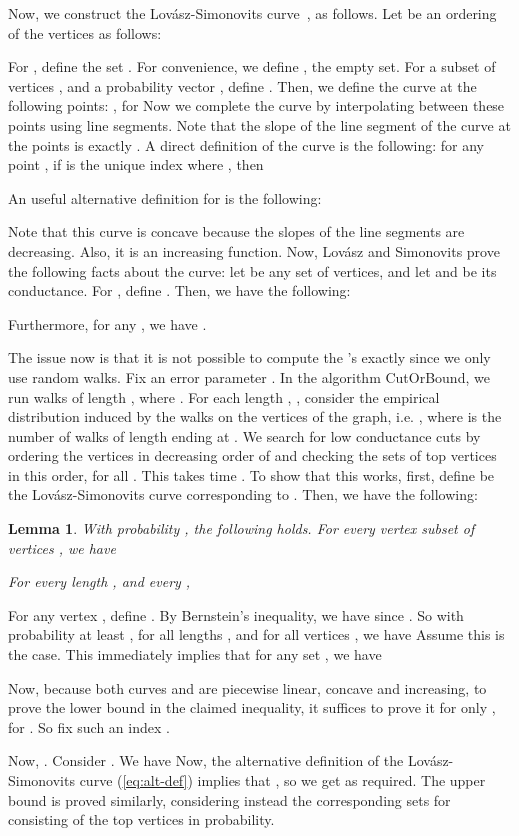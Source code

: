 \documentclass[11pt]{article}
\newtheorem{Lem}[theorem]{Lemma}
\newenvironment{myproof}{\noindent {\sc Proof:}}{}
\newcommand\CutOrBound{{\sc CutOrBound}\xspace}
\begin{document}
Now, we construct the Lov\'{a}sz-Simonovits curve~\cite{LS90},  as follows. Let  be an ordering of the vertices
as follows:

For , define the set . For convenience, we
define , the empty set. For a subset of vertices , and a
probability vector , define . Then, we define
the curve  at the following points: ,
for  Now we complete the curve  by
interpolating between these points using line segments. Note that the slope of
the line segment of the curve at the points  is
exactly .  A direct definition of the
curve is the following: for any point , if  is the unique
index where , then 

An useful alternative definition for  is the following:


Note that this curve is concave because the slopes of the line segments are
decreasing. Also, it is an increasing function. Now, Lov\'{a}sz and Simonovits prove the following facts about the
curve: let  be any set of vertices, and let  and  be its conductance.
For , define . Then, we have the following:

Furthermore, for any , we have
.

The issue now is that it is not possible to compute the 's exactly since we only use random walks. Fix an error parameter . In the algorithm \CutOrBound, we run  walks of length , where . For each length
, , consider the empirical distribution 
induced by the walks on the vertices of the graph, i.e. , where  is the number of walks of length  ending at . We search for low conductance cuts by ordering the vertices in decreasing order of  and checking the sets of top  vertices in this order, for all . This takes time . To show that this works,
first, define  be the Lov\'{a}sz-Simonovits curve corresponding to
. Then, we have the following:
\begin{Lem} \label{lem:concentration-ptil}
With probability , the following
holds. For every vertex subset of vertices , we have

For every length , and every ,

\end{Lem}
\begin{myproof}
For any vertex , define . By Bernstein's
inequality, we have  since . So
with probability at least , for all lengths , and for all vertices
, we have  Assume this is the case. This immediately
implies that for any set , we have 

Now, because both curves  and  are piecewise linear, concave and
increasing, to prove the lower bound in the claimed inequality, it suffices to
prove it for only , for . So fix
such an index .

Now, . Consider . We have
 Now, the alternative
definition of the Lov\'{a}sz-Simonovits curve (\ref{eq:alt-def}) implies that
, so we get  as required. The upper bound is
proved similarly, considering instead the corresponding sets 
for  consisting of the top  vertices in  probability.
\end{myproof}
\end{document}
